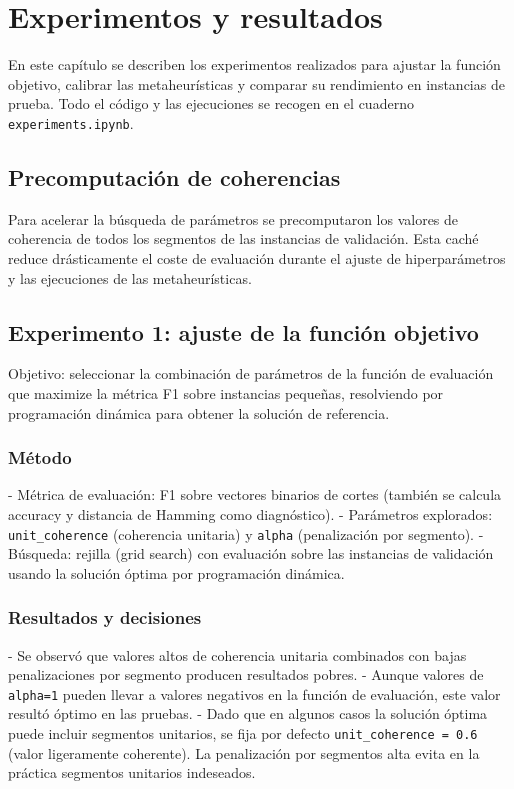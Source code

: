 \chapter{Experimentos y resultados}
\label{chap:experiments}

En este capítulo se describen los experimentos realizados para ajustar la función objetivo, calibrar las metaheurísticas y comparar su rendimiento en instancias de prueba. Todo el código y las ejecuciones se recogen en el cuaderno \texttt{experiments.ipynb}.

\section{Precomputación de coherencias}
Para acelerar la búsqueda de parámetros se precomputaron los valores de coherencia de todos los segmentos de las instancias de validación. Esta caché reduce drásticamente el coste de evaluación durante el ajuste de hiperparámetros y las ejecuciones de las metaheurísticas.

\section{Experimento 1: ajuste de la función objetivo}
\label{sec:exp1}
Objetivo: seleccionar la combinación de parámetros de la función de evaluación que maximize la métrica F1 sobre instancias pequeñas, resolviendo por programación dinámica para obtener la solución de referencia.

\subsection{Método}
- Métrica de evaluación: F1 sobre vectores binarios de cortes (también se calcula accuracy y distancia de Hamming como diagnóstico).
- Parámetros explorados: \texttt{unit\_coherence} (coherencia unitaria) y \texttt{alpha} (penalización por segmento).
- Búsqueda: rejilla (grid search) con evaluación sobre las instancias de validación usando la solución óptima por programación dinámica.

\subsection{Resultados y decisiones}
- Se observó que valores altos de coherencia unitaria combinados con bajas penalizaciones por segmento producen resultados pobres.
- Aunque valores de \texttt{alpha=1} pueden llevar a valores negativos en la función de evaluación, este valor resultó óptimo en las pruebas.
- Dado que en algunos casos la solución óptima puede incluir segmentos unitarios, se fija por defecto \texttt{unit\_coherence = 0.6} (valor ligeramente coherente). La penalización por segmentos alta evita en la práctica segmentos unitarios indeseados.

